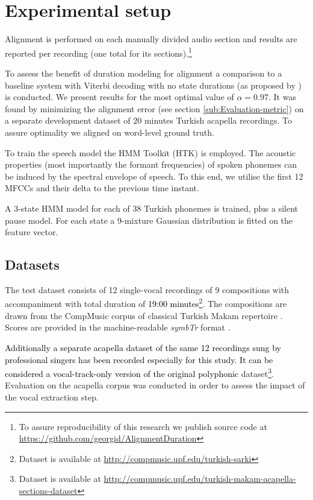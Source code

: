 \documentclass{article}
\begin{document}
\section{Experimental setup}

Alignment is performed on each manually divided audio section and
results are reported per recording (one total for its sections).\footnote{To assure reproducibility of this research we publish source code at \url{https://github.com/georgid/AlignmentDuration}}

To assess the benefit of duration modeling for alignment a comparison
to a baseline system with Viterbi decoding with no state durations  (as proposed by \cite{rabiner1989tutorial} ) is conducted.
We present results for the most optimal value of $\alpha=0.97$. It was found
by minimizing the alignment error (see section \ref{sub:Evaluation-metric})
on a separate development dataset of 20 minutes Turkish acapella recordings.
To assure optimality we aligned on word-level ground truth.

To train the speech model the HMM Toolkit (HTK) \cite{young1993htk}
is employed. The acoustic properties (most importantly the formant
frequencies) of spoken phonemes can be induced by the spectral envelope
of speech. To this end, we utilise the first 12 MFCCs and their delta
to the previous time instant.

A 3-state HMM model for each of 38 Turkish phonemes is trained, plus
a silent pause model. For each state a 9-mixture Gaussian distribution
is fitted on the feature vector. 



\subsection{Datasets}

The test dataset consists of 12 single-vocal recordings of 9 compositions with accompaniment with total duration of \textcolor{black}{19:00
minutes}\footnote{Dataset is available at \url{http://compmusic.upf.edu/turkish-sarki}}.  The compositions are drawn from the CompMusic corpus of classical Turkish Makam repertoire \cite{uyar2014corpus_dlfm}. Scores are provided in the machine-readable
\emph{symbTr} format \cite{karaosmanouglu2012turkish}. 

\textcolor{black}{Additionally a separate acapella dataset of the
same 12 recordings sung by professional singers has been recorded especially
for this study. It can be considered a vocal-track-only version of
the original polyphonic}\textcolor{green}{{} }dataset\footnote{Dataset is available at \url{http://compmusic.upf.edu/turkish-makam-acapella-sections-dataset}}. {Evaluation
on the acapella corpus was conducted in order to assess the impact
of the vocal extraction step.}\textcolor{red}{{} }
\end{document}
